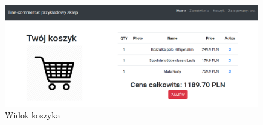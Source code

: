 \begin{figure}
	\begin{center}
		\includegraphics[scale=0.4]{koszyk.png}
	\end{center}
	\caption{{\color{black}Widok koszyka}} \label{koszykscr}
\end{figure}











